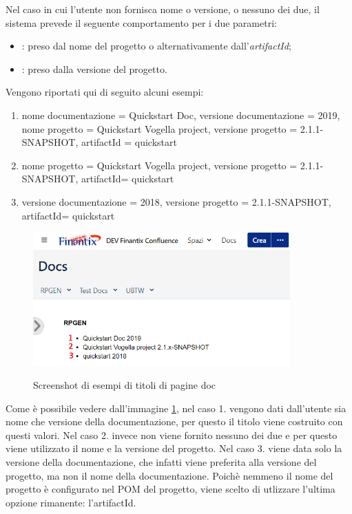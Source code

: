 
	Nel caso in cui l'utente non fornisca nome o versione, o nessuno dei due, il sistema prevede il seguente comportamento per i due parametri:
	\begin{itemize}
		\item {}: preso dal nome del progetto o alternativamente dall'\emph{artifactId};
		\item {}: preso dalla versione del progetto.
	\end{itemize} 

	Vengono riportati qui di seguito alcuni esempi:
	\begin{enumerate}
		\item nome documentazione = Quickstart Doc, versione documentazione = 2019, nome progetto = Quickstart Vogella project, versione progetto = 2.1.1-SNAPSHOT, artifactId = quickstart
		\item nome progetto = Quickstart Vogella project, versione progetto = 2.1.1-SNAPSHOT,  artifactId= quickstart
		\item versione documentazione = 2018, versione progetto = 2.1.1-SNAPSHOT,  artifactId= quickstart
	\end{enumerate}

	\begin{figure}[H]
		\centering
		\includegraphics[width=0.88\textwidth]{immagini/DocsExamples.png}\\
		\caption{Screenshot di esempi di titoli di pagine doc}
		\label{screenDocsNameVersion}
	\end{figure}

	Come è possibile vedere dall'immagine \underline{\ref{screenDocsNameVersion}}, nel caso 1. vengono dati dall'utente sia nome che versione della documentazione, per questo il titolo viene costruito con questi valori.
	Nel caso 2. invece non viene fornito nessuno dei due e per questo viene utilizzato il nome e la versione del progetto. 
	Nel caso 3. viene data solo la versione della documentazione, che infatti viene preferita alla versione del progetto, ma non il nome della documentazione. 
	Poichè nemmeno il nome del progetto è configurato nel POM del progetto, viene scelto di utlizzare l'ultima opzione rimanente: l'artifactId.

